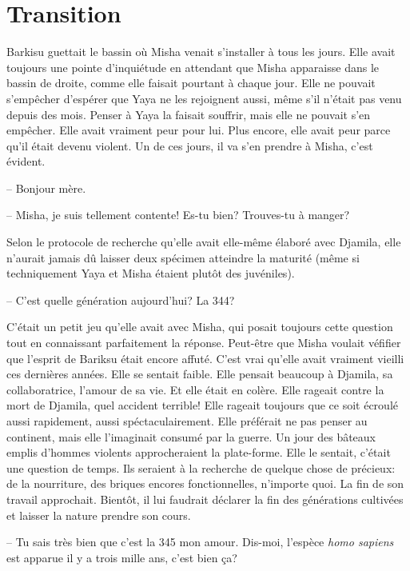 \chapter{Transition}

Barkisu guettait le bassin où Misha venait s'installer à tous les jours.
%
Elle avait toujours une pointe d'inquiétude en attendant que Misha apparaisse
dans le bassin de droite, comme elle faisait pourtant à chaque jour.  
%
Elle ne pouvait s'empêcher d'espérer que Yaya ne les rejoignent aussi, même
s'il n'était pas venu depuis des mois.
% 
Penser à Yaya la faisait souffrir, mais elle ne pouvait s'en empêcher.
%
Elle avait vraiment peur pour lui. 
%
Plus encore, elle avait peur parce qu'il était devenu violent. 
%
Un de ces jours, il va s'en prendre à Misha, c'est évident.

-- Bonjour mère.

-- Misha, je suis tellement contente! Es-tu bien? Trouves-tu à manger?

Selon le protocole de recherche qu'elle avait elle-même élaboré avec Djamila,
elle n'aurait jamais dû laisser deux spécimen atteindre la maturité (même si techniquement Yaya et Misha étaient plutôt des juvéniles).
%

-- C'est quelle génération aujourd'hui? La 344?

C'était un petit jeu qu'elle avait avec Misha, qui posait toujours cette
question tout en connaissant parfaitement la réponse.
%
Peut-être que Misha voulait véfifier que l'esprit de Bariksu était encore affuté.
%
C'est vrai qu'elle avait vraiment vieilli ces dernières années. 
%
Elle se sentait faible.
% 
Elle pensait beaucoup à Djamila, sa collaboratrice, l'amour de sa vie.
%
Et elle était en colère.
%
Elle rageait contre la mort de Djamila, quel accident terrible!
%
Elle rageait toujours que \nomProjet{} ce soit écroulé aussi rapidement, aussi
spéctaculairement.
%
Elle préférait ne pas penser au continent, mais elle l'imaginait consumé par la
guerre.
%
Un jour des bâteaux emplis d'hommes violents approcheraient la plate-forme.
Elle le sentait, c'était une question de temps. 
Ils seraient à la recherche de quelque chose de précieux: de la nourriture, des briques encores fonctionnelles, n'importe
quoi.
%
La fin de son travail approchait. 
%
Bientôt, il lui faudrait déclarer la fin des générations cultivées et laisser la nature prendre son cours.
%

-- Tu sais très bien que c'est la 345 mon amour. Dis-moi, l'espèce \textit{homo sapiens} est apparue il y a trois mille ans, c'est bien ça?

